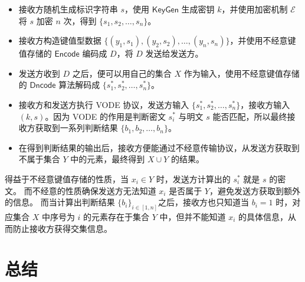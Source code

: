 \begin{itemize}
  \item 接收方随机生成标识字符串 $s$，使用 $\mathsf{KeyGen}$ 生成密钥 $k$，并使用加密机制 $\mathcal{E}$ 将 $s$ 加密 $n$ 次，得到 $\{s_1, s_2, \dots, s_n\}$。
  \item 接收方构造键值型数据 $\{(y_1, s_1), (y_2, s_2), \dots, (y_n, s_n)\}$，并使用不经意键值存储的 $\mathsf{Encode}$ 编码成 $D$，将 $D$ 发送给发送方。
  \item 发送方收到 $D$ 之后，便可以用自己的集合 $X$ 作为输入，使用不经意键值存储的 $\mathsf{Dncode}$ 算法解码成 $\{s_1^*, s_2^*, \dots, s_n^*\}$。
  \item 接收方和发送方执行 VODE 协议，发送方输入 $\{s_1^*, s_2^*, \dots, s_n^*\}$，接收方输入 $(k, s)$。因为 VODE 的作用是判断密文 $s_i^*$ 与明文 $s$ 能否匹配，所以最终接收方获取到一系列判断结果 $\{b_1, b_2, \dots, b_n\}$。
  \item 在得到判断结果的输出后，接收方便能通过不经意传输协议，从发送方获取到不属于集合 $Y$ 中的元素，最终得到 $X\cup Y$ 的结果。
\end{itemize}
得益于不经意键值存储的性质，当 $x_i \in Y$ 时，发送方计算出的 $s_i^*$ 就是 $s$ 的密文。
而不经意的性质确保发送方无法知道 $x_i$ 是否属于 $Y$，避免发送方获取到额外的信息。
而当计算出判断结果 $\{b_i\}_{i\in[1,n]}$之后，接收方也只知道当 $b_i=1$ 时，对应集合 $X$ 中序号为 $i$ 的元素存在于集合 $Y$ 中，但并不能知道 $x_i$ 的具体信息，从而防止接收方获得交集信息。


\section{总结}

